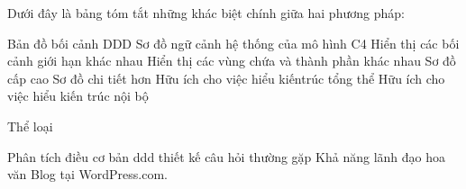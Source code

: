 Dưới đây là bảng tóm tắt những khác biệt chính giữa hai phương pháp:

Bản đồ bối cảnh DDD	Sơ đồ ngữ cảnh hệ thống của mô hình C4
Hiển thị các bối cảnh giới hạn khác nhau	Hiển thị các vùng chứa và thành phần khác nhau
Sơ đồ cấp cao	Sơ đồ chi tiết hơn
Hữu ích cho việc hiểu kiến ​​trúc tổng thể	Hữu ích cho việc hiểu kiến ​​trúc nội bộ

Thể loại

Phân tích
điều cơ bản
ddd
thiết kế
câu hỏi thường gặp
Khả năng lãnh đạo
hoa văn
Blog tại WordPress.com.



